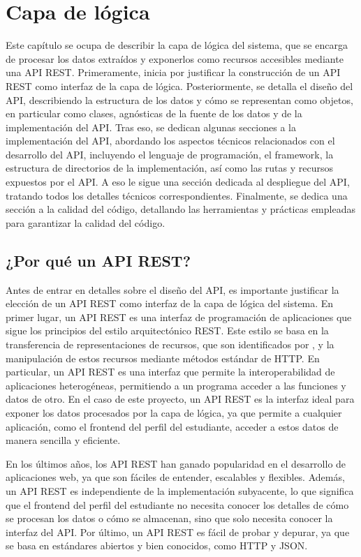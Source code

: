 \chapter{Capa de lógica}

Este capítulo se ocupa de describir la capa de lógica del sistema, que se encarga de procesar los datos extraídos y exponerlos como recursos accesibles mediante una \gls{API REST}. Primeramente, inicia por justificar la construcción de un \gls{API REST} como interfaz de la capa de lógica. Posteriormente, se detalla el diseño del \gls{API}, describiendo la estructura de los datos y cómo se representan como objetos, en particular como clases, agnósticas de la fuente de los datos y de la implementación del \gls{API}. Tras eso, se dedican algunas secciones a la implementación del \gls{API}, abordando los aspectos técnicos relacionados con el desarrollo del \gls{API}, incluyendo el lenguaje de programación, el framework, la estructura de directorios de la implementación, así como las rutas y recursos expuestos por el \gls{API}. A eso le sigue una sección dedicada al despliegue del \gls{API}, tratando todos los detalles técnicos correspondientes. Finalmente, se dedica una sección a la calidad del código, detallando las herramientas y prácticas empleadas para garantizar la calidad del código.

\section{¿Por qué un API REST?}

Antes de entrar en detalles sobre el diseño del \gls{API}, es importante justificar la elección de un \gls{API REST} como interfaz de la capa de lógica del sistema. En primer lugar, un \gls{API REST} es una interfaz de programación de aplicaciones que sigue los principios del estilo arquitectónico \gls{REST}. Este estilo se basa en la transferencia de representaciones de recursos, que son identificados por , y la manipulación de estos recursos mediante métodos estándar de \gls{HTTP}. En particular, un \gls{API REST} es una interfaz que permite la interoperabilidad de aplicaciones heterogéneas, permitiendo a un programa acceder a las funciones y datos de otro. En el caso de este proyecto, un \gls{API REST} es la interfaz ideal para exponer los datos procesados por la capa de lógica, ya que permite a cualquier aplicación, como el frontend del perfil del estudiante, acceder a estos datos de manera sencilla y eficiente.

En los últimos años, los \gls{API REST} han ganado popularidad en el desarrollo de aplicaciones web, ya que son fáciles de entender, escalables y flexibles. Además, un \gls{API REST} es independiente de la implementación subyacente, lo que significa que el frontend del perfil del estudiante no necesita conocer los detalles de cómo se procesan los datos o cómo se almacenan, sino que solo necesita conocer la interfaz del \gls{API}. Por último, un \gls{API REST} es fácil de probar y depurar, ya que se basa en estándares abiertos y bien conocidos, como \gls{HTTP} y \gls{JSON}.

